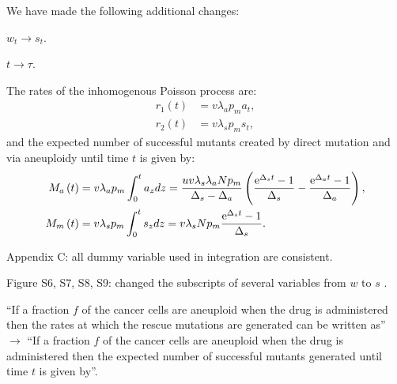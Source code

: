 \documentclass[12pt]{extarticle}
\newcommand{\e}{{\rm e}}
\begin{document}
{\color{blue}


We have made the following additional changes:

$w_t\rightarrow s_t$. %

$t\rightarrow \tau$. %

The rates of the inhomogenous Poisson process are: %
\begin{align*}
r_1\left(t\right)&=v\lambda_ap_ma_{t},\\ 
r_2\left(t\right)&=v\lambda_sp_ms_{t},
\end{align*}
and the expected number of successful mutants created by direct mutation and via aneuploidy until time $t$ is given by:
\begin{align*}
M_a\left(t\right)&=v\lambda_ap_m\int_0^ta_{z} d z = \frac{uv\lambda_s\lambda_aNp_m}{\Delta_s-\Delta_a}\left(\frac{\e^{\Delta_st}-1}{\Delta_s}-\frac{\e^{\Delta_at}-1}{\Delta_a}\right),\\ 
M_m\left(t\right)&=v\lambda_sp_m\int_0^ts_{z} d z = v\lambda_sNp_m\frac{\e^{\Delta_s t}-1}{\Delta_s}.
\end{align*}
 

Appendix C: all dummy variable used in integration are consistent. %

Figure S6, S7, S8, S9: changed the subscripts of several variables from $w$ to $s$ . %

``If a fraction $f$ of the cancer cells are aneuploid when the drug is administered then the rates at which the rescue mutations are generated can be written as'' $\rightarrow$
``If a fraction $f$ of the cancer cells are aneuploid when the drug is administered then the expected number of successful mutants generated until time $t$ is given by''. %

}



\end{document}
